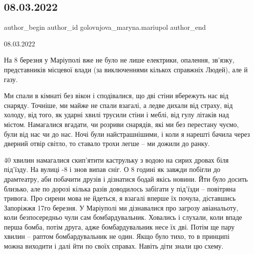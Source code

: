  
 
 
 
 

\subsection{08.03.2022}
\label{sec:04_04_2022.fb.golovnjova_maryna.mariupol.1.08_03_2022}

\ifcmt
 author_begin
   author_id golovnjova_maryna.mariupol
 author_end
\fi

08.03.2022

На 8 березня у Маріуполі вже не було не лише електрики, опалення, зв'язку,
представників місцевої влади (за виключеннями кількох справжніх Людей), але й
газу.

Ми спали в кімнаті без вікон і сподівалися, що дві стіни вбережуть нас від
снаряду. Точніше, ми майже не спали взагалі, а ледве дихали від страху, від
холоду, від того, як ударні хвилі трусили стіни і меблі, від гулу літаків над
містом. Намагалися  вгадати, чи розриви снарядів, які ми без перестану чуємо,
були від нас чи до нас. Ночі були найстрашнішими, і коли я нарешті бачила через
дверний отвір світло, то ставало трохи легше – ми дожили до ранку.


40 хвилин намагалися скип'ятити каструльку з водою на сирих дровах біля
під'їзду. На вулиці -8 і знов випав сніг. О 8 годині як завжди побігли до
драмтеатру, аби побачити друзів і дізнатися бодай якісь новини. Йти було досить
близько, але по дорозі кілька разів доводилось забігати у під'їзди – повітряна
тривога. Про сирени мова не йдеться, я взагалі вперше їх почула, діставшись
Запоріжжя 17го березня. У Маріуполі ми дізнавалися про загрозу авіанальоту,
коли безпосередньо чули сам бомбардувальник. Ховались і слухали, коли впаде
перша бомба, потім друга, адже бомбардувальник несе їх дві. Потім ще пару
хвилин – раптом бомбардувальник не один. Якщо було тихо, то в принципі можна
виходити і далі йти по своїх справах. Навіть діти знали цю схему.


